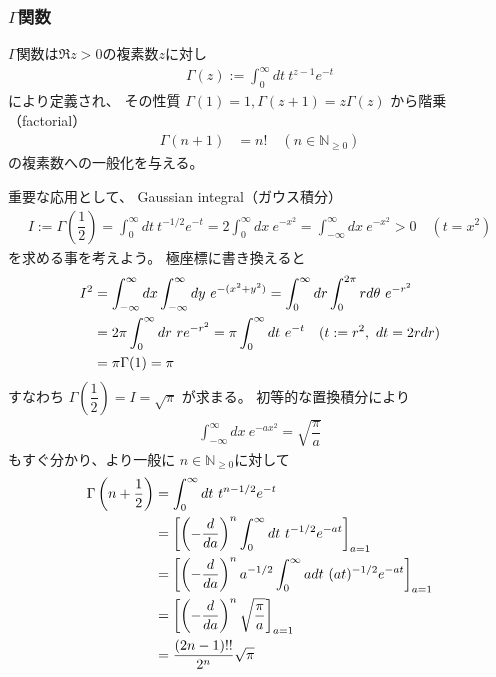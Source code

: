 \subsubsection{$\Gamma$関数}

$\Gamma$関数は$\Re z > 0$の複素数$z$に対し
\begin{align}
    \Gamma(z)
    := \int_0^\infty dt\ t^{z-1} e^{-t}
\end{align}
により定義され、
その性質
$\Gamma(1) = 1, \Gamma(z+1) = z\Gamma(z)$
から階乗（factorial）
\begin{align}
    \Gamma(n+1) &= n!
    \quad
    (n \in \mathbb{N}_{\ge0})
\end{align}
の複素数への一般化を与える。

重要な応用として、
Gaussian integral（ガウス積分）
\begin{align}
    I :=
    \Gamma\left(\dfrac{1}{2}\right)
    =
    \int_{0}^{\infty} dt\ t^{-1/2}e^{-t}
    =
    2
    \int_{0}^{\infty} dx\ e^{-x^2}
    =
    \int_{-\infty}^{\infty} dx\ e^{-x^2}
    > 0
    \quad(t=x^2)
\end{align}
を求める事を考えよう。
極座標に書き換えると
\begin{align}
    I^2 &=
    \int_{-\infty}^{\infty} dx
    \int_{-\infty}^{\infty} dy
    \ 
        e^{-(x^2 + y^2)}
=
    \int_0^{\infty} dr
    \int_0^{2\pi} r d\theta
    \ 
        e^{-r^2}
\notag\\&=
    2 \pi
    \int_0^{\infty} dr
    \ r 
        e^{-r^2}
=
    \pi
    \int_0^{\infty} dt\ e^{-t}
    \quad(t:=r^2,\ dt = 2 r dr)
\notag\\&=
    \pi\Gamma(1)
    = \pi
\end{align}
すなわち
$\Gamma\left(\dfrac{1}{2}\right)
= I = \sqrt{\pi}$
が求まる。
初等的な置換積分により
\begin{align}
    \int_{-\infty}^{\infty} dx\ e^{-ax^2}
    =
    \sqrt{
        \dfrac{\pi}{a}
    }
\label{gaussian integral}
\end{align}
もすぐ分かり、より一般に
$n \in \mathbb{N}_{\ge0}$に対して
\begin{align}
    \Gamma\left( n + \dfrac{1}{2} \right)
    &=
    \int_0^\infty dt\ t^{n-1/2} e^{-t}
\notag\\&=
    \left[
        \left(
            -
            \dfrac{d}{da}
        \right)^n
        \int_0^\infty dt\ t^{-1/2} e^{-at}
    \right]_{a=1}
\notag\\&=
    \left[
    \left(
        -
        \dfrac{d}{da}
    \right)^n
        a^{-1/2}
        \int_0^\infty a dt\ (at)^{-1/2} e^{-at}
    \right]_{a=1}
\notag\\&=
    \left[
    \left(
        -
        \dfrac{d}{da}
    \right)^n
    \sqrt{
        \dfrac{\pi}{a}
    }
    \right]_{a=1}
\notag\\&=
    \dfrac{(2n-1)!!}{2^{n}}\sqrt{\pi}
\end{align}
